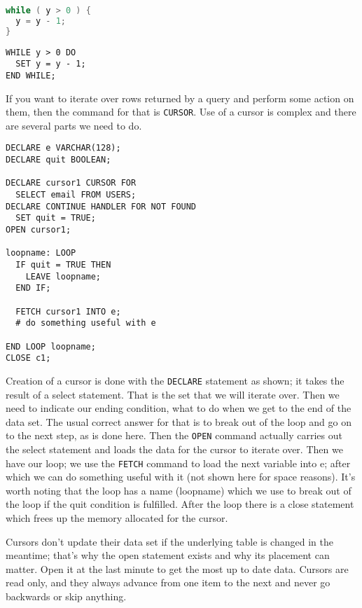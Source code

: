 \begin{multicols}{2}
\begin{lstlisting}[language=C]
while ( y > 0 ) {
  y = y - 1;
} 
\end{lstlisting}
\columnbreak
\begin{verbatim}
WHILE y > 0 DO
  SET y = y - 1;
END WHILE;
\end{verbatim}
\end{multicols}

If you want to iterate over rows returned by a query and perform some action on them, then the command for that is \texttt{CURSOR}. Use of a cursor is complex and there are several parts we need to do.

{\small
\begin{verbatim}
DECLARE e VARCHAR(128);
DECLARE quit BOOLEAN;

DECLARE cursor1 CURSOR FOR 
  SELECT email FROM USERS;
DECLARE CONTINUE HANDLER FOR NOT FOUND
  SET quit = TRUE;  
OPEN cursor1;

loopname: LOOP
  IF quit = TRUE THEN
    LEAVE loopname;
  END IF;

  FETCH cursor1 INTO e;
  # do something useful with e

END LOOP loopname;
CLOSE c1;
\end{verbatim}
}

Creation of a cursor is done with the \texttt{DECLARE} statement as shown; it takes the result of a select statement. That is the set that we will iterate over. Then we need to indicate our ending condition, what to do when we get to the end of the data set. The usual correct answer for that is to break out of the loop and go on to the next step, as is done here. Then the \texttt{OPEN} command actually carries out the select statement and loads the data for the cursor to iterate over. Then we have our loop; we use the \texttt{FETCH} command to load the next variable into e; after which we can do something useful with it (not shown here for space reasons). It's worth noting that the loop has a name (loopname) which we use to break out of the loop if the quit condition is fulfilled. After the loop there is a close statement which frees up the memory allocated for the cursor.

Cursors don't update their data set if the underlying table is changed in the meantime; that's why the open statement exists and why its placement can matter. Open it at the last minute to get the most up to date data. Cursors are read only, and they always advance from one item to the next and never go backwards or skip anything.

